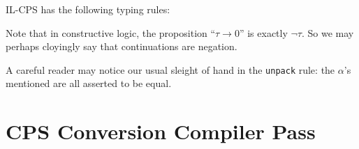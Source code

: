 \documentclass{amsart}
\newcommand{\pack}{\text{\texttt{pack} }}
\newcommand{\unpack}{\text{\texttt{unpack} }}
\newcommand{\iin}{\text{ \texttt{in} }}
\newcommand{\halt}{\text{\texttt{halt}}}
\newcommand{\llet}{\text{\texttt{let} }}
\newcommand{\as}{\text{ \texttt{as} }}
\begin{document}
IL-CPS has the following typing rules:
Note that in constructive logic, the proposition ``$\tau \rightarrow 0$'' is exactly $\neg\tau$. So we may perhaps cloyingly say that continuations are negation. 

A careful reader may notice our usual sleight of hand in the \texttt{unpack} rule: the $\alpha$'s mentioned are all asserted to be equal.

\section{CPS Conversion Compiler Pass}
\end{document}
